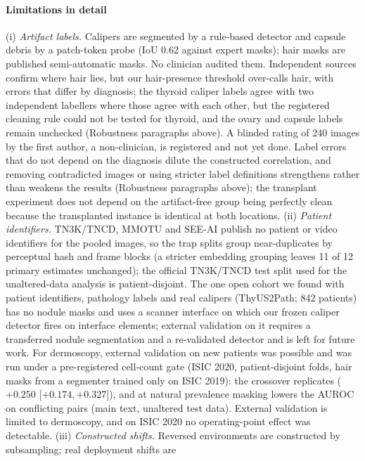\paragraph{Limitations in detail}
(i) \emph{Artifact labels.} Calipers are segmented by a rule-based detector and capsule debris by a patch-token probe
(IoU 0.62 against expert masks); hair masks are published semi-automatic masks. No clinician audited them. Independent
sources confirm where hair lies, but our hair-presence threshold over-calls hair, with errors that differ by diagnosis;
the thyroid caliper labels agree with two independent labellers where those agree with each other, but the registered
cleaning rule could not be tested for thyroid, and the ovary and capsule labels remain unchecked (Robustness paragraphs above).
A blinded rating of 240 images by the first author, a non-clinician, is registered and not yet done. Label errors that
do not depend on the diagnosis dilute the constructed correlation, and removing contradicted images or using stricter
label definitions strengthens rather than weakens the results (Robustness paragraphs above); the transplant experiment does not depend on the artifact-free group being
perfectly clean because the transplanted instance is identical at both locations.
(ii) \emph{Patient identifiers.} TN3K/TNCD, MMOTU and SEE-AI publish no patient or video identifiers for the pooled
images, so the trap splits group near-duplicates by perceptual hash and frame blocks (a stricter embedding grouping
leaves 11 of 12 primary estimates unchanged); the official TN3K/TNCD test split used for the unaltered-data analysis is
patient-disjoint. The one open cohort we found with patient identifiers, pathology labels and real calipers
(ThyUS2Path; 842 patients) has no nodule masks and uses a scanner interface on which our frozen caliper detector
fires on interface elements; external validation on it requires a transferred nodule segmentation and a re-validated
detector and is left for future work. For dermoscopy, external validation on new patients was possible and was run under
a pre-registered cell-count gate (ISIC 2020, patient-disjoint folds, hair masks from a segmenter trained only on
ISIC 2019): the crossover replicates ($+0.250$ [$+0.174, +0.327$]), and at natural prevalence masking lowers the AUROC on
conflicting pairs (main text, unaltered test data). External validation is limited to dermoscopy, and on ISIC 2020 no
operating-point effect was detectable.
(iii) \emph{Constructed shifts.} Reversed environments are constructed by subsampling; real deployment shifts are
